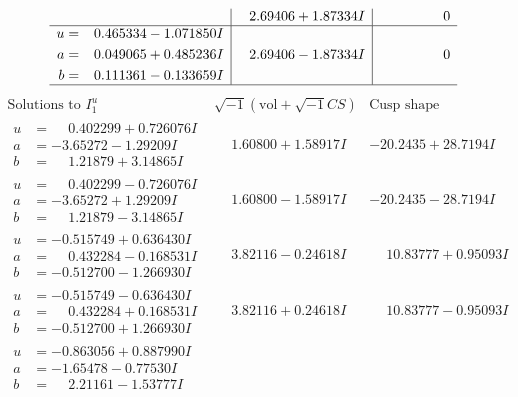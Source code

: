 \documentclass[1p]{elsarticle_modified}
\theoremstyle{definition}
\newcommand{\I}{\sqrt{-1}}
\begin{document}
$$\begin{array}{c|c|c}
 & \phantom{-}2.69406 + 1.87334 I & \phantom{-0.000000 } 0 \\ \hline\begin{aligned}
u &= \phantom{-}0.465334 - 1.071850 I \\
a &= \phantom{-}0.049065 + 0.485236 I \\
b &= \phantom{-}0.111361 - 0.133659 I\end{aligned}
 & \phantom{-}2.69406 - 1.87334 I & \phantom{-0.000000 } 0\\
 \hline 
 \end{array}$$\newpage$$\begin{array}{c|c|c}  
\text{Solutions to }I^u_{1}& \I (\text{vol} + \sqrt{-1}CS) & \text{Cusp shape}\\
 \hline 
\begin{aligned}
u &= \phantom{-}0.402299 + 0.726076 I \\
a &= -3.65272 - 1.29209 I \\
b &= \phantom{-}1.21879 + 3.14865 I\end{aligned}
 & \phantom{-}1.60800 + 1.58917 I & -20.2435 + 28.7194 I \\ \hline\begin{aligned}
u &= \phantom{-}0.402299 - 0.726076 I \\
a &= -3.65272 + 1.29209 I \\
b &= \phantom{-}1.21879 - 3.14865 I\end{aligned}
 & \phantom{-}1.60800 - 1.58917 I & -20.2435 - 28.7194 I \\ \hline\begin{aligned}
u &= -0.515749 + 0.636430 I \\
a &= \phantom{-}0.432284 - 0.168531 I \\
b &= -0.512700 - 1.266930 I\end{aligned}
 & \phantom{-}3.82116 - 0.24618 I & \phantom{-}10.83777 + 0.95093 I \\ \hline\begin{aligned}
u &= -0.515749 - 0.636430 I \\
a &= \phantom{-}0.432284 + 0.168531 I \\
b &= -0.512700 + 1.266930 I\end{aligned}
 & \phantom{-}3.82116 + 0.24618 I & \phantom{-}10.83777 - 0.95093 I \\ \hline\begin{aligned}
u &= -0.863056 + 0.887990 I \\
a &= -1.65478 - 0.77530 I \\
b &= \phantom{-}2.21161 - 1.53777 I\end{aligned}

\end{array}$$
\end{document}
